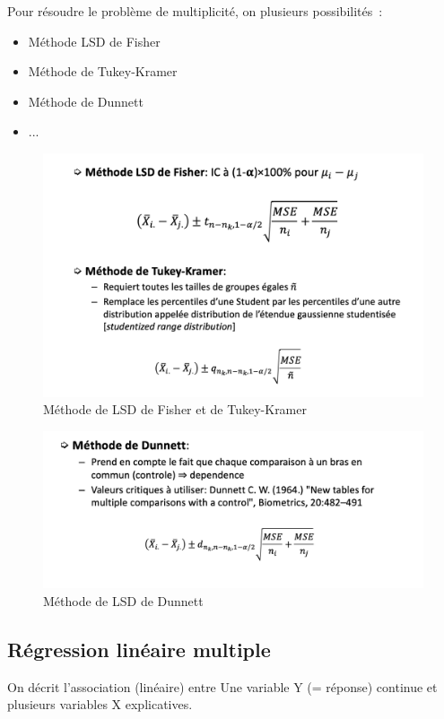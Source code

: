 Pour résoudre le problème de multiplicité, on plusieurs possibilités :
\begin{itemize}
    \item Méthode LSD de Fisher
    \item Méthode de Tukey-Kramer
    \item Méthode de Dunnett
    \item ...
\end{itemize}

\begin{figure}[H]
    \centering
    \includegraphics[scale=0.4]{images/LSD_Tukey.png}
    \caption{Méthode de LSD de Fisher et de Tukey-Kramer}
    \label{fig:my_label}
\end{figure}

\begin{figure}[H]
    \centering
    \includegraphics[scale=0.4]{images/Dunnett.png}
    \caption{Méthode de LSD de Dunnett}
    \label{fig:my_label}
\end{figure}


\subsection{Régression linéaire multiple}
On décrit l’association (linéaire) entre Une variable Y (= réponse) continue et plusieurs variables X explicatives.

